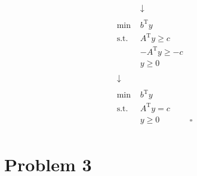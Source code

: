 \documentclass[12pt]{article}
\begin{document}
\begin{align*}
    & \downarrow \\
    \\
    \text{min } & b^\text{T}y \\
    \text{s.t. } & A^\text{T}y \geq c \\
    & -A^\text{T}y \geq -c \\
    & y \geq 0 \\
    \\
    \downarrow \\
    \\
    \text{min } & b^\text{T}y \\
    \text{s.t. } & A^\text{T}y = c \\
    & y \geq 0 & \square\\
\end{align*}

\newpage
\section*{Problem 3}
\end{document}
